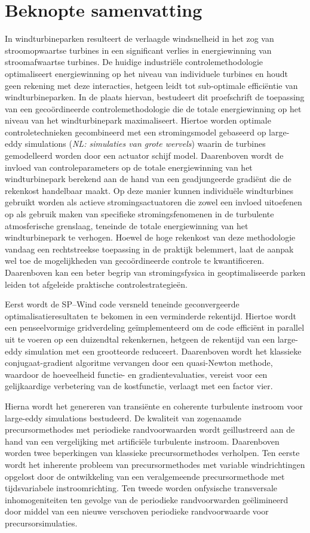 \chapter*{Beknopte samenvatting}

In windturbineparken resulteert de verlaagde windsnelheid in het zog van stroomopwaartse turbines in een significant verlies in energiewinning van stroomafwaartse turbines. De huidige industri\"ele controlemethodologie optimaliseert energiewinning op het niveau van individuele turbines en houdt geen rekening met deze interacties, hetgeen leidt tot sub-optimale effici\"entie van windturbineparken. In de plaats hiervan, bestudeert dit proefschrift de toepassing van een geco\"ordineerde controlemethodologie die de totale energiewinning op het niveau van het windturbinepark maximaliseert. Hiertoe worden optimale controletechnieken gecombineerd met een stromingsmodel gebaseerd op large-eddy simulations (\emph{NL: simulaties van grote wervels}) waarin de turbines gemodelleerd worden door een actuator schijf model. Daarenboven wordt de invloed van controleparameters op de totale energiewinning van het windturbinepark berekend aan de hand van een geadjungeerde gradi\"ent die de rekenkost handelbaar maakt. Op deze manier kunnen individu\"ele windturbines gebruikt worden als actieve stromingsactuatoren die zowel een invloed uitoefenen op als gebruik maken van specifieke stromingsfenomenen in de turbulente atmosferische grenslaag, teneinde de totale energiewinning van het windturbinepark te verhogen. Hoewel de hoge rekenkost van deze methodologie vandaag een rechtstreekse toepassing in de praktijk belemmert, laat de aanpak wel toe de mogelijkheden van geco\"ordineerde controle te kwantificeren. Daarenboven kan een beter begrip van stromingsfysica in geoptimaliseerde parken leiden tot afgeleide praktische controlestrategie\"en. 

Eerst wordt de SP--Wind code versneld teneinde geconvergeerde optimalisatieresultaten te bekomen in een verminderde rekentijd. Hiertoe wordt een penseelvormige gridverdeling  ge\"implementeerd om de code effici\"ent in parallel uit te voeren op een duizendtal rekenkernen, hetgeen de rekentijd van een large-eddy simulation met een grootteorde reduceert. Daarenboven wordt het klassieke conjugaat-gradient algoritme vervangen door een quasi-Newton methode, waardoor de hoeveelheid functie- en gradientevaluaties, vereist voor een gelijkaardige verbetering van de kostfunctie, verlaagt met een factor vier. 

Hierna wordt het genereren van transi\"ente en coherente turbulente instroom voor large-eddy simulations bestudeerd. De kwaliteit van zogenaamde precursormethodes met periodieke randvoorwaarden wordt geillustreerd aan de hand van een vergelijking met artifici\"ele turbulente instroom. Daarenboven worden twee beperkingen van klassieke precursormethodes verholpen. Ten eerste wordt het inherente probleem van precursormethodes met variable windrichtingen opgelost door de ontwikkeling van een veralgemeende precursormethode met tijdsvariabele instroomrichting. Ten tweede worden onfysische transversale inhomogeniteiten ten gevolge van de periodieke randvoorwarden ge\"elimineerd door middel van een nieuwe verschoven periodieke randvoorwaarde voor precursorsimulaties. 

